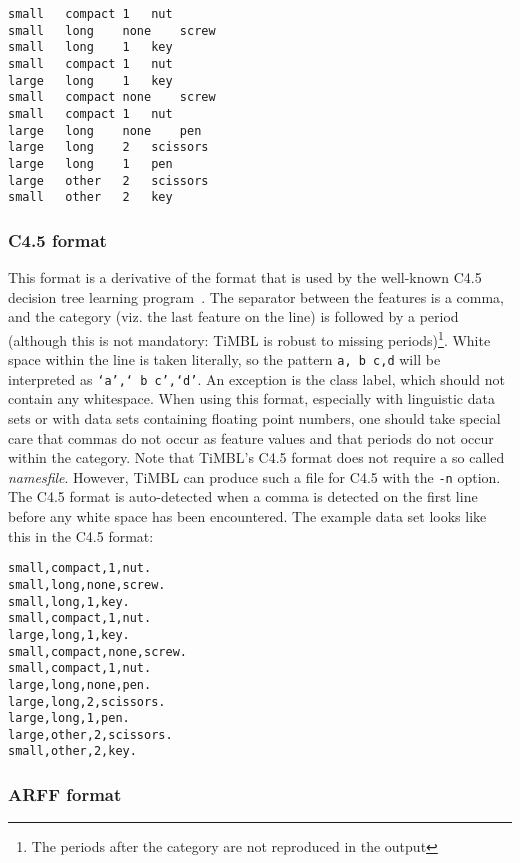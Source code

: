\documentclass{book}
\begin{document}
\begin{footnotesize}
\begin{verbatim}
small	compact	1	nut
small	long	none	screw
small	long	1	key
small	compact	1	nut
large	long	1	key
small	compact	none	screw
small	compact	1	nut
large	long	none	pen
large	long	2	scissors
large	long	1	pen
large	other	2	scissors
small	other	2	key
\end{verbatim}
\end{footnotesize}

\subsubsection{C4.5 format}
\label{c45format}

This format is a derivative of the format that is used by the
well-known C4.5 decision tree learning program~\cite{Quinlan93}.  The
separator between the features is a comma, and the category (viz.  the
last feature on the line) is followed by a period (although this is
not mandatory: TiMBL is robust to missing periods)\footnote{The
periods after the category are not reproduced in the output}.  White
space within the line is taken literally, so the pattern {\tt a,\ b\
c,d} will be interpreted as {\tt `a',`\ b\ c',`d'}. An exception is the 
class label, which should not contain any whitespace. When using this
format, especially with linguistic data sets or with data sets
containing floating point numbers, one should take special care that
commas do not occur as feature values and that periods do not
occur within the category.  Note that TiMBL's C4.5 format does not
require a so called {\em namesfile}.  However, TiMBL can produce such
a file for C4.5 with the {\tt -n} option.  The C4.5 format is
auto-detected when a comma is detected on the first line before
any white space has been encountered. The example data set looks like
this in the C4.5 format:

\begin{footnotesize}
\begin{verbatim}
small,compact,1,nut.
small,long,none,screw.
small,long,1,key.
small,compact,1,nut.
large,long,1,key.
small,compact,none,screw.
small,compact,1,nut.
large,long,none,pen.
large,long,2,scissors.
large,long,1,pen.
large,other,2,scissors.
small,other,2,key.
\end{verbatim}
\end{footnotesize}

\subsubsection{ARFF format}
\label{arffformat}
\end{document}
